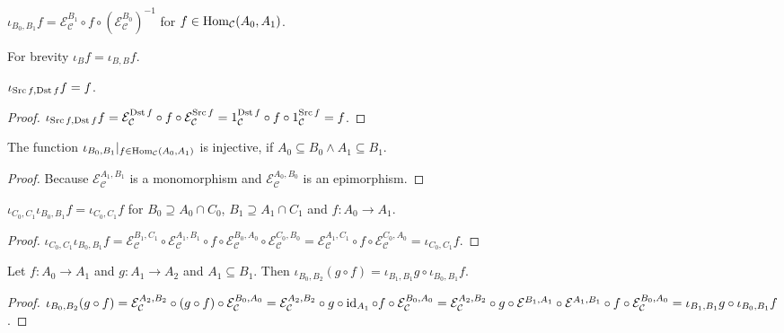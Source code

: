 \begin{defn}
  $\iota_{B_0, B_1} f = \mathcal{E}_{\mathcal{C}}^{B_1} \circ f \circ
  (\mathcal{E}_{\mathcal{C}}^{B_0})^{-1}$ for $f \in
  \operatorname{Hom}_{\mathcal{C}} (A_0 , A_1)$.
\end{defn}

For brevity $\iota_B f = \iota_{B, B} f$.

\begin{prop}
  $\iota_{\operatorname{Src} f, \operatorname{Dst} f} f = f$.
\end{prop}

\begin{proof}
  $\iota_{\operatorname{Src} f, \operatorname{Dst} f} f = \mathcal{E}_\mathcal{C}^{\operatorname{Dst} f} \circ f \circ \mathcal{E}_\mathcal{C}^{\operatorname{Src} f} =
  1_{\mathcal{C}}^{\operatorname{Dst} f} \circ f \circ 1_{\mathcal{C}}^{\operatorname{Src} f} = f$.
\end{proof}

\begin{prop}
  The function $\iota_{B_0, B_1} |_{f \in \operatorname{Hom}_{\mathcal{C}} (A_0 ,
  A_1)}$ is injective, if $A_0 \subseteq B_0 \wedge A_1 \subseteq B_1$.
\end{prop}

\begin{proof}
  Because $\mathcal{E}_{\mathcal{C}}^{A_1,B_1}$ is a monomorphism and $\mathcal{E}_{\mathcal{C}}^{A_0,B_0}$ is an epimorphism.
\end{proof}

\begin{prop}
  $\iota_{C_0, C_1} \iota_{B_0, B_1} f = \iota_{C_0, C_1} f$ for $B_0
  \supseteq A_0 \cap C_0$, $B_1 \supseteq A_1 \cap C_1$ and $f : A_0
  \rightarrow A_1$.
\end{prop}

\begin{proof}
  $\iota_{C_0, C_1} \iota_{B_0, B_1} f = \mathcal{E}_{\mathcal{C}}^{B_1,C_1}
  \circ \mathcal{E}_{\mathcal{C}}^{A_1,B_1} \circ f \circ \mathcal{E}_{\mathcal{C}}^{B_0,A_0} \circ
  \mathcal{E}_{\mathcal{C}}^{C_0,B_0} = \mathcal{E}_{\mathcal{C}}^{A_1,C_1} \circ f \circ \mathcal{E}_{\mathcal{C}}^{C_0,A_0} =
  \iota_{C_0,C_1} f$.
\end{proof}

\begin{prop}
  Let $f : A_0 \rightarrow A_1$ and $g : A_1 \rightarrow A_2$ and $A_1
  \subseteq B_1$. Then $\iota_{B_0, B_2} (g \circ f) = \iota_{B_1, B_1} g
  \circ \iota_{B_0, B_1} f$.
\end{prop}

\begin{proof}
  $\iota_{B_0, B_2} (g \circ f) = \mathcal{E}_{\mathcal{C}}^{A_2,B_2}
  \circ (g \circ f) \circ \mathcal{E}_{\mathcal{C}}^{B_0,A_0} = \mathcal{E}_{\mathcal{C}}^{A_2,B_2} \circ g \circ \operatorname{id}_{A_1} \circ f
  \circ \mathcal{E}_{\mathcal{C}}^{B_0,A_0} = \mathcal{E}_{\mathcal{C}}^{A_2,B_2} \circ g \circ \mathcal{E}^{B_1,A_1}
  \circ \mathcal{E}^{A_1,B_1} \circ f \circ \mathcal{E}_{\mathcal{C}}^{B_0,A_0} = \iota_{B_1, B_1} g \circ \iota_{B_0,
  B_1} f$.
\end{proof}

